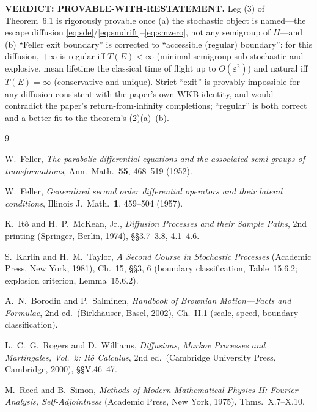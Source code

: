 \documentclass[11pt]{article}
\theoremstyle{remark}
\begin{document}
\bigskip
\noindent\textbf{VERDICT: PROVABLE-WITH-RESTATEMENT.}
Leg (3) of Theorem~6.1 is rigorously provable once (a) the stochastic
object is named---the escape diffusion
\eqref{eq:sde}/\eqref{eq:smdrift}--\eqref{eq:smzero}, not any semigroup
of $H$---and (b) ``Feller exit boundary'' is corrected to ``accessible
(regular) boundary'': for this diffusion, $+\infty$ is regular iff
$T(E)<\infty$ (minimal semigroup sub-stochastic and explosive, mean
lifetime the classical time of flight up to $O(\varepsilon^{2})$) and
natural iff $T(E)=\infty$ (conservative and unique).  Strict ``exit''
is provably impossible for any diffusion consistent with the paper's
own WKB identity, and would contradict the paper's return-from-infinity
completions; ``regular'' is both correct and a better fit to the
theorem's (2)(a)--(b).

\begin{thebibliography}{9}

W.~Feller,
\emph{The parabolic differential equations and the associated
semi-groups of transformations},
Ann.\ Math.\ \textbf{55}, 468--519 (1952).

W.~Feller,
\emph{Generalized second order differential operators and their
lateral conditions},
Illinois J.\ Math.\ \textbf{1}, 459--504 (1957).

K.~It\^o and H.~P.~McKean, Jr.,
\emph{Diffusion Processes and their Sample Paths},
2nd printing (Springer, Berlin, 1974), \S\S3.7--3.8, 4.1--4.6.

S.~Karlin and H.~M.~Taylor,
\emph{A Second Course in Stochastic Processes}
(Academic Press, New York, 1981), Ch.~15, \S\S3, 6
(boundary classification, Table~15.6.2; explosion criterion,
Lemma~15.6.2).

A.~N.~Borodin and P.~Salminen,
\emph{Handbook of Brownian Motion---Facts and Formulae},
2nd ed.\ (Birkh\"auser, Basel, 2002), Ch.~II.1
(scale, speed, boundary classification).

L.~C.~G.~Rogers and D.~Williams,
\emph{Diffusions, Markov Processes and Martingales, Vol.~2:
It\^o Calculus},
2nd ed.\ (Cambridge University Press, Cambridge, 2000), \S\S V.46--47.

M.~Reed and B.~Simon,
\emph{Methods of Modern Mathematical Physics II: Fourier Analysis,
Self-Adjointness}
(Academic Press, New York, 1975), Thms.~X.7--X.10.

\end{thebibliography}
\end{document}
